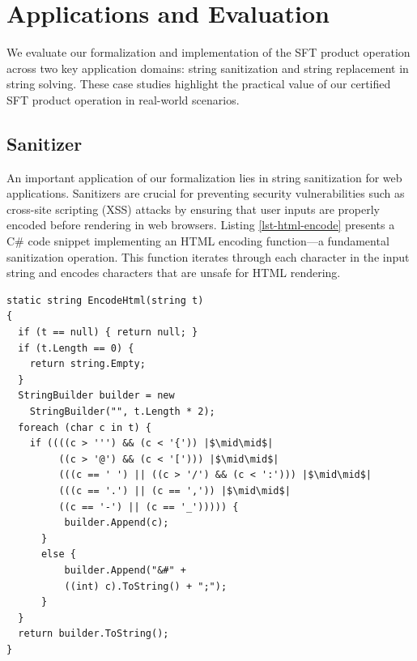 \section{Applications and Evaluation}
We evaluate our formalization and implementation of the SFT product operation across two key application domains: string sanitization and string replacement in string solving. These case studies highlight the practical value of our certified SFT product operation in real-world scenarios.
\subsection{Sanitizer}

An important application of our formalization lies in string sanitization for web applications. Sanitizers are crucial for preventing security vulnerabilities such as cross-site scripting (XSS) attacks by ensuring that user inputs are properly encoded before rendering in web browsers. Listing \ref{lst-html-encode} presents a C\# code snippet implementing an HTML encoding function—a fundamental sanitization operation. This function iterates through each character in the input string and encodes characters that are unsafe for HTML rendering.



\begin{lstlisting}[language={[Sharp]C}, caption={C\# Code for AntiXSS.EncodeHtml version 2.0.}, label={lst-html-encode}, float=htbp]
static string EncodeHtml(string t)
{
  if (t == null) { return null; }
  if (t.Length == 0) {
    return string.Empty;
  }
  StringBuilder builder = new
    StringBuilder("", t.Length * 2);
  foreach (char c in t) {
    if ((((c > ''') && (c < '{')) |$\mid\mid$|
         ((c > '@') && (c < '['))) |$\mid\mid$|
         (((c == ' ') || ((c > '/') && (c < ':'))) |$\mid\mid$|
         (((c == '.') || (c == ',')) |$\mid\mid$|
         ((c == '-') || (c == '_'))))) {
          builder.Append(c);
      }
      else {
          builder.Append("&#" +
          ((int) c).ToString() + ";");
      }
  }
  return builder.ToString();
}
\end{lstlisting}

